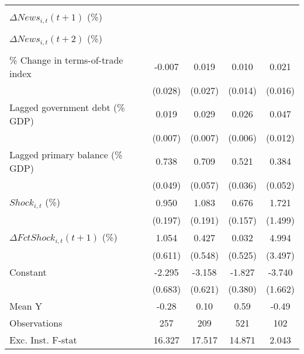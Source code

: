 {\begin{tabular}{l*{4}{c}}
                    &                     &                     &                     &                     \\
\addlinespace
$ \Delta News_{i,t}(t+1)$ (\%)&                     &                     &                     &                     \\
                    &                     &                     &                     &                     \\
\addlinespace
$ \Delta News_{i,t}(t+2)$ (\%)&                     &                     &                     &                     \\
                    &                     &                     &                     &                     \\
\addlinespace
\% Change in terms-of-trade index&      -0.007         &       0.019         &       0.010         &       0.021         \\
                    &     (0.028)         &     (0.027)         &     (0.014)         &     (0.016)         \\
\addlinespace
Lagged government debt (\% GDP)&       0.019\sym{**} &       0.029\sym{***}&       0.026\sym{***}&       0.047\sym{***}\\
                    &     (0.007)         &     (0.007)         &     (0.006)         &     (0.012)         \\
\addlinespace
Lagged primary balance (\% GDP)&       0.738\sym{***}&       0.709\sym{***}&       0.521\sym{***}&       0.384\sym{***}\\
                    &     (0.049)         &     (0.057)         &     (0.036)         &     (0.052)         \\
\addlinespace
$ Shock_{i,t}$ (\%) &       0.950\sym{***}&       1.083\sym{***}&       0.676\sym{***}&       1.721         \\
                    &     (0.197)         &     (0.191)         &     (0.157)         &     (1.499)         \\
\addlinespace
$ \Delta FctShock_{i,t}(t+1)$ (\%)&       1.054         &       0.427         &       0.032         &       4.994         \\
                    &     (0.611)         &     (0.548)         &     (0.525)         &     (3.497)         \\
\addlinespace
Constant            &      -2.295\sym{***}&      -3.158\sym{***}&      -1.827\sym{***}&      -3.740\sym{**} \\
                    &     (0.683)         &     (0.621)         &     (0.380)         &     (1.662)         \\
\midrule
Mean Y              &       -0.28         &        0.10         &        0.59         &       -0.49         \\
Observations        &         257         &         209         &         521         &         102         \\
Exc. Inst. F-stat   &      16.327         &      17.517         &      14.871         &       2.043         \\
\bottomrule
\end{tabular}
}
